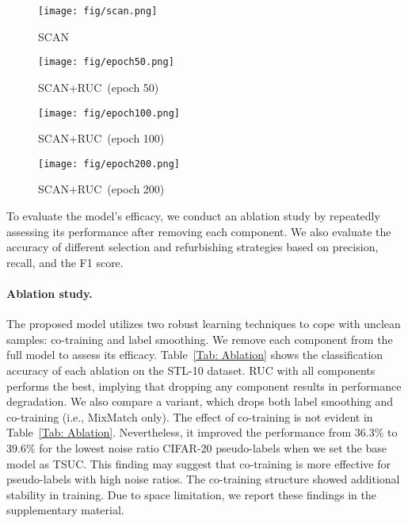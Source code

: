 \documentclass[final]{cvpr}
\newcommand{\model}{\textsf{RUC}}
\newcommand{\cutparagraphup}{\vspace*{-0.15in}}
\begin{document}
\begin{figure*}[!t]
\begin{minipage}[b]{0.98\linewidth}
\centering
    \begin{subfigure}[b]{0.22\textwidth}
      \texttt{[image: fig/scan.png]}
      \caption{SCAN}
    \end{subfigure}
    \hspace{3mm}
    \begin{subfigure}[b]{0.22\textwidth}
      \texttt{[image: fig/epoch50.png]}
      \caption{SCAN+\model~(epoch 50)}
    \end{subfigure}
    \hspace{3mm}
    \begin{subfigure}[b]{0.22\textwidth}
      \texttt{[image: fig/epoch100.png]}
      \caption{SCAN+\model~(epoch 100)}
    \end{subfigure}
    \hspace{3mm}
    \begin{subfigure}[b]{0.22\textwidth}
      \texttt{[image: fig/epoch200.png]}
      \caption{SCAN+\model~(epoch 200)}
    \end{subfigure}    
\caption{Visualization of clustering results on STL-10. The leftmost figure shows the results from the SCAN, while the right three figures display the intermediate results of our model on top of SCAN at different training epochs. This result demonstrates that \model{} effectively alleviates the overconfident predictions while enhancing the clustering quality.}
\label{fig:progress}
\end{minipage}
\end{figure*}



To evaluate the model's efficacy, we conduct an ablation study by repeatedly assessing its performance after removing each component. We also evaluate the accuracy of different selection and refurbishing strategies based on precision, recall, and the F1 score.  
\cutparagraphup
\paragraph{Ablation study.} The proposed model utilizes two robust learning techniques to cope with unclean samples: co-training and label smoothing. We remove each component from the full model to assess its efficacy. Table~\ref{Tab: Ablation} shows the classification accuracy of each ablation on the STL-10 dataset. \model{} with all components performs the best, implying that dropping any component results in performance degradation. We also compare a variant, which drops both label smoothing and co-training (i.e., MixMatch only). The effect of co-training is not evident in Table~\ref{Tab: Ablation}. Nevertheless, it improved the performance from 36.3\% to 39.6\% for the lowest noise ratio CIFAR-20 pseudo-labels when we set the base model as TSUC. This finding may suggest that co-training is more effective for pseudo-labels with high noise ratios. The co-training structure showed additional stability in training. Due to space limitation, we report these findings in the supplementary material. 
\end{document}
